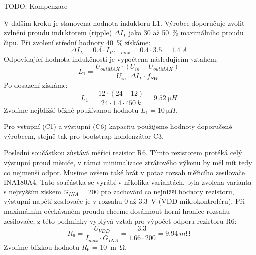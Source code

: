     TODO: Kompenzace

    V dalším kroku je stanovena hodnota induktoru L1. Výrobce doporučuje zvolit zvlnění proudu induktorem (ripple) \(\Delta I_{L}  \) jako 30 až \qty{50}{\percent} maximálního proudu čipu. Při zvolení střední hodnoty \qty{40}{\percent} získáme:
    \begin{equation}
        \Delta I_{L} = \num{0.4}\cdot I_{IC-max} = \num{0.4} \cdot  \num{3.5} = \qty{1.4}{A}
    \end{equation}
    Odpovídající hodnota indukčnosti je vypočtena následujícím vztahem:
    \begin{equation}
        L_{1} = \frac{U_{outMAX}\cdot (U_{in} -U_{outMAX} ) }{U_{in} \cdot \Delta I_{L}\cdot f_{SW}  }
    \end{equation}
    Po dosazení získáme:
    \begin{equation}
        L_{1} = \frac{12\cdot (24 -12 ) }{24 \cdot \num{1.4}\cdot \qty{450}{k}  } = \qty{9.52}{\micro H}
    \end{equation}
    Zvolíme nejbližší běžně používanou hodnotu \(L_{1} = \qty{10}{\micro H}\).

    Pro vstupní (C1) a výstupní (C6) kapacitu použijeme hodnoty doporučené výrobcem, stejně tak pro bootstrap kondenzátor C3. 
    
    Poslední součástkou zůstává měřicí rezistor R6. Tímto rezistorem protéká celý výstupní proud měniče, v rámci minimalizace ztrátového výkonu by měl mít tedy co nejmenší odpor. Musíme ovšem také brát v potaz rozsah měřicího zesilovače INA180A4. Tato součástka se vyrábí v několika variantách, byla zvolena varianta s nejvyšším ziskem \(G_{INA}=200 \) pro zachování co nejnižší hodnoty rezistoru, výstupní napětí zesilovače je v rozsahu 0 až \qty{3.3}{V} (VDD mikrokontroléru).
    Při maximálním očekávaném proudu chceme dosáhnout horní hranice rozsahu zesilovače, z této podmínky vyplývá vztah pro výpočet odporu rezirtoru R6:
    \begin{equation}
        R_{6} = \frac{U_{VDD}}{I_{max} \cdot G_{INA} } = \frac{\num{3.3}}{\num{1.66}\cdot 200} = \qty{9.94}{m\ohm}
    \end{equation} 
    Zvolíme blízkou hodnotu \(R_{6} \) = \qty{10}{m\ohm}.



